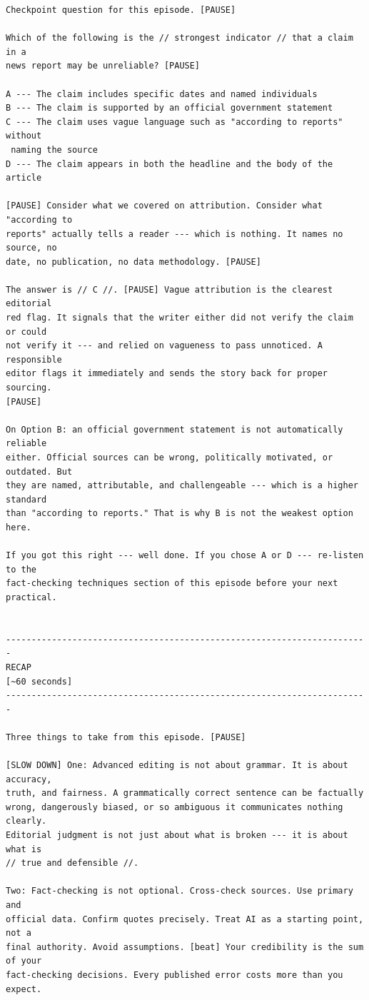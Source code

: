 {\begin{Verbatim}
Checkpoint question for this episode. [PAUSE]

Which of the following is the // strongest indicator // that a claim in a
news report may be unreliable? [PAUSE]

A --- The claim includes specific dates and named individuals
B --- The claim is supported by an official government statement
C --- The claim uses vague language such as "according to reports" without
 naming the source
D --- The claim appears in both the headline and the body of the article

[PAUSE] Consider what we covered on attribution. Consider what "according to
reports" actually tells a reader --- which is nothing. It names no source, no
date, no publication, no data methodology. [PAUSE]

The answer is // C //. [PAUSE] Vague attribution is the clearest editorial
red flag. It signals that the writer either did not verify the claim or could
not verify it --- and relied on vagueness to pass unnoticed. A responsible
editor flags it immediately and sends the story back for proper sourcing.
[PAUSE]

On Option B: an official government statement is not automatically reliable
either. Official sources can be wrong, politically motivated, or outdated. But
they are named, attributable, and challengeable --- which is a higher standard
than "according to reports." That is why B is not the weakest option here.

If you got this right --- well done. If you chose A or D --- re-listen to the
fact-checking techniques section of this episode before your next practical.


-----------------------------------------------------------------------
RECAP
[~60 seconds]
-----------------------------------------------------------------------

Three things to take from this episode. [PAUSE]

[SLOW DOWN] One: Advanced editing is not about grammar. It is about accuracy,
truth, and fairness. A grammatically correct sentence can be factually
wrong, dangerously biased, or so ambiguous it communicates nothing clearly.
Editorial judgment is not just about what is broken --- it is about what is
// true and defensible //.

Two: Fact-checking is not optional. Cross-check sources. Use primary and
official data. Confirm quotes precisely. Treat AI as a starting point, not a
final authority. Avoid assumptions. [beat] Your credibility is the sum of your
fact-checking decisions. Every published error costs more than you expect.


\end{Verbatim}}
